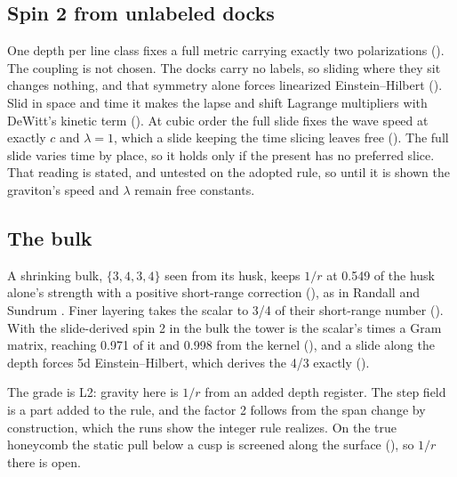 \subsection{Spin 2 from unlabeled docks}

One depth per line class fixes a full metric carrying exactly two polarizations (). The coupling is
not chosen. The docks carry no labels, so sliding where they sit changes nothing, and that symmetry alone forces
linearized Einstein--Hilbert (). Slid in space and time it makes the lapse and shift Lagrange
multipliers with DeWitt's kinetic term (). At cubic order the full slide fixes the wave speed at
exactly $c$ and $\lambda = 1$, which a slide keeping the time slicing leaves free (). The full slide
varies time by place, so it holds only if the present has no preferred slice. That reading is stated, and untested
on the adopted rule, so until it is shown the graviton's speed and $\lambda$ remain free constants.

\subsection{The bulk}

A shrinking bulk, $\{3,4,3,4\}$ seen from its husk, keeps $1/r$ at 0.549 of the husk alone's strength with a positive
short-range correction (), as in Randall and Sundrum \cite{randall1999}. Finer layering takes the
scalar to 3/4 of their short-range number (). With the slide-derived spin 2 in the bulk the tower is
the scalar's times a Gram matrix, reaching 0.971 of it and 0.998 from the kernel (), and a slide along
the depth forces 5d Einstein--Hilbert, which derives the 4/3 exactly ().

The grade is L2: gravity here is $1/r$ from an added depth register. The step field is a part added to the rule, and
the factor 2 follows from the span change by construction, which the runs show the integer rule realizes. On the true
honeycomb the static pull below a cusp is screened along the surface (), so $1/r$ there is open.
